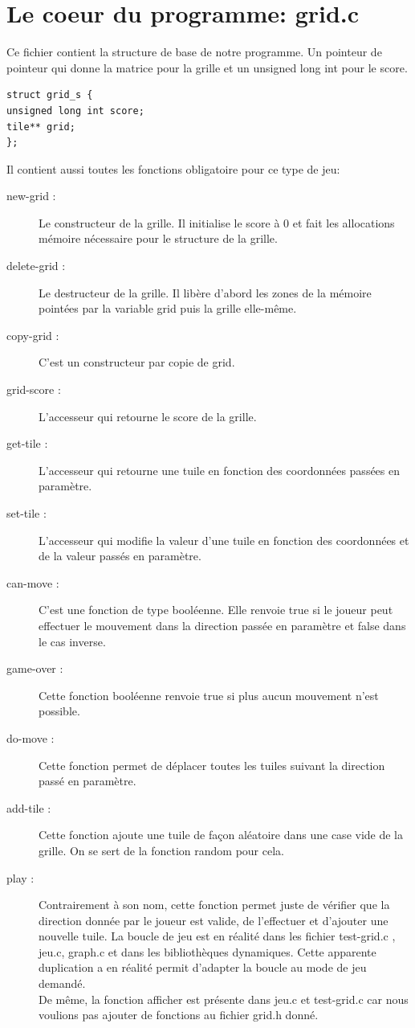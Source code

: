 \documentclass{report}
\begin{document}
\section{Le coeur du programme: grid.c}
Ce fichier contient la structure de base de notre programme. Un pointeur de pointeur qui donne la matrice pour la grille et un unsigned long int pour le score.
\begin{lstlisting}[frame=single]
struct grid_s {
unsigned long int score;
tile** grid;
};
\end{lstlisting}

Il contient aussi toutes les fonctions obligatoire pour ce type de jeu:\\

\begin{description}
\item [new-grid :] Le constructeur de la grille. Il initialise le score à 0 et fait les allocations mémoire nécessaire pour le structure de la grille.
\item [delete-grid :] Le destructeur de la grille. Il libère d'abord les zones de la mémoire pointées par la variable grid puis la grille elle-même.
\item [copy-grid :] C'est un constructeur par copie de grid.
\item [grid-score :] L'accesseur qui retourne le score de la grille.
\item [get-tile :]  L'accesseur qui retourne une tuile en fonction des coordonnées passées en paramètre.
\item [set-tile :] L'accesseur qui modifie la valeur d'une tuile en fonction des coordonnées et de la valeur passés en paramètre.
\item [can-move :] C'est une fonction de type booléenne. Elle renvoie true si le joueur peut effectuer le mouvement dans la direction passée en paramètre et false dans le cas inverse.
\item [game-over :] Cette fonction booléenne renvoie true si plus aucun mouvement n'est possible.
\item [do-move :]Cette fonction permet de déplacer toutes les tuiles suivant la direction passé en paramètre.
\item [add-tile :] Cette fonction ajoute une tuile de façon aléatoire dans une case vide de la grille. On se sert de la fonction random pour cela.
\item [play :]Contrairement à son nom, cette fonction permet juste de vérifier que la direction donnée par le joueur est valide, de l'effectuer et d'ajouter une nouvelle tuile. La boucle de jeu est en réalité dans les fichier test-grid.c , jeu.c, graph.c et dans les bibliothèques dynamiques. Cette apparente duplication a en réalité permit d'adapter la boucle au mode de jeu demandé.\\ De même, la fonction afficher est présente dans jeu.c et test-grid.c car nous voulions pas ajouter de fonctions au fichier grid.h donné.
\end{description}
\end{document}
